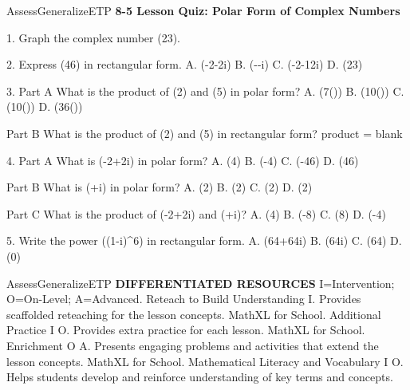 \documentclass{article}
\newenvironment{te-addendum}[2]{}{}     %
\newcommand{\answer}[1]{}               %
\newcommand{\placeholder}[2]{}          %
\newcommand{\te}[1]{}                   %
\begin{document}
\begin{te-addendum}{Assess}{GeneralizeETP}
\textbf{8-5 Lesson Quiz: Polar Form of Complex Numbers}
\te{ASSESSMENT RESOURCES. Name blank. enVision Algebra 2. SavvasRealize.com. Copyright© Savvas Learning Company LLC. All Rights Reserved. enVision Algebra 2 Assessment Sourcebook.}
1. Graph the complex number (2\frac{2\pi}3).
\answer{1. See graph.}
\placeholder{graph}{Black double-arrowed real and imaginary axes, O origin, half-unit grid window [-2.5,2.5] on both axes, labels -2,-1,1,2. Magenta segment from O to filled point (-1,sqrt(3)), length label 2, counterclockwise angle arc labeled theta=2pi/3.}
2. Express (4\frac{7\pi}6) in rectangular form.
A. (-2-2i)
B. (--i)
C. (-2-\frac12i)
D. (2\frac{14\pi}3)
\answer{2. A}
3. Part A What is the product of (2\frac{}) and (5\frac{}) in polar form?
A. (7(\frac{}))
B. (10(\frac{}))
C. (10(\frac{}))
D. (36(\frac{}))
\answer{3. Part A C}
Part B What is the product of (2\frac{}) and (5\frac{}) in rectangular form?
product = blank
\answer{3. Part B (10i)}
4. Part A What is (-2+2i) in polar form?
A. (4\frac{})
B. (-4\frac{})
C. (-4\frac{5\pi}6)
D. (4\frac{5\pi}6)
\answer{4. Part A D}
Part B What is (+i) in polar form?
A. (2\frac{})
B. (2\frac{})
C. (2\frac{})
D. (2\pi)
\answer{4. Part B A}
Part C What is the product of (-2+2i) and (+i)?
A. (4\pi)
B. (-8\pi)
C. (8\pi)
D. (-4\pi)
\answer{4. Part C C}
5. Write the power ((1-i)^6) in rectangular form.
A. (64+64i)
B. (64i)
C. (64)
D. (0)
\answer{5. C}
\end{te-addendum}
\begin{te-addendum}{Assess}{GeneralizeETP}
\textbf{DIFFERENTIATED RESOURCES}
I=Intervention; O=On-Level; A=Advanced.
Reteach to Build Understanding I. Provides scaffolded reteaching for the lesson concepts. MathXL for School.
Additional Practice I O. Provides extra practice for each lesson. MathXL for School.
Enrichment O A. Presents engaging problems and activities that extend the lesson concepts. MathXL for School.
Mathematical Literacy and Vocabulary I O. Helps students develop and reinforce understanding of key terms and concepts.
\te{Resource sheets each print Name blank, enVision Algebra 2, SavvasRealize.com, lesson title Polar Form of Complex Numbers, Copyright© Savvas Learning Company LLC. All Rights Reserved., and enVision Algebra 2 Teaching Resources.}
\end{te-addendum}
\end{document}
